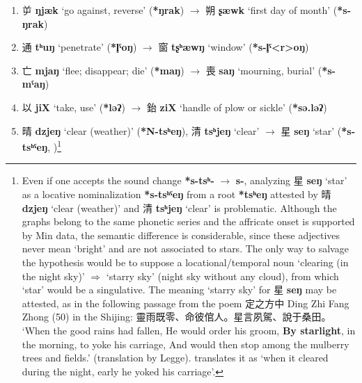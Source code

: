 \documentclass[oneside,a4paper,11pt]{article}
\newcommand{\ipa}[1]{\textbf{{\phon\mbox{#1}}}} %
\newcommand{\zh}[1]{{\cn #1}}
\newcommand{\zhc}[2]{\zh{#1} \ipa{#2}}
\begin{document}
\begin{enumerate}
\item \zhc{屰}{ŋjæk} ‘go against, reverse’ (\ipa{*ŋrak})  $\rightarrow$ \zhc{朔}{ʂæwk} ‘first day of month’  (\ipa{*s-ŋrak})
\item \zhc{通}{tʰuŋ} ‘penetrate’ (\ipa{*l̥ˤoŋ}) $\rightarrow$ \zhc{窗}{tʂʰæwŋ} ‘window’ (\ipa{*s-l̥ˤ<r>oŋ})
\item \zhc{亡}{mjaŋ} ‘flee; disappear; die’ (\ipa{*maŋ}) $\rightarrow$ \zhc{喪}{saŋ} ‘mourning, burial’ (\ipa{*s-mˤaŋ})
\item \zhc{以}{jiX} ‘take, use’ (\ipa{*ləʔ}) $\rightarrow$ \zhc{鈶}{ziX} ‘handle of plow or sickle’ (\ipa{*sə.ləʔ})
\item \zhc{晴}{dzjeŋ} ‘clear (weather)’ (\ipa{*N-tsʰeŋ}), \zhc{清}{tsʰjeŋ} ‘clear'  $\rightarrow$ \zhc{星}{seŋ} `star’ (\ipa{*s-tsʰˤeŋ},  \citealt[139]{bs14oc})\footnote{Even if one accepts the sound change \ipa{*s-tsʰ-} $\rightarrow$ \ipa{s-}, analyzing \zhc{星}{seŋ} `star’ as a locative nominalization \ipa{*s-tsʰˤeŋ} from a root \ipa{*tsʰeŋ} attested by \zhc{晴}{dzjeŋ} ‘clear (weather)’ and \zhc{清}{tsʰjeŋ} ‘clear' is problematic. Although the graphs belong to the same phonetic series and the affricate onset is supported by Min data, the semantic difference is considerable, since these adjectives never mean `bright' and are not associated to stars. The only way to salvage the hypothesis would be to suppose a locational/temporal noun `clearing (in the night sky)' $\Rightarrow$ `starry sky' (night sky without any cloud), from which `star' would be a singulative.
The meaning `starry sky' for \zhc{星}{seŋ} may be attested, as in the following passage from the poem \zh{定之方中} Ding Zhi Fang Zhong (50) in the Shijing: \zh{靈雨既零、命彼倌人。星言夙駕、說于桑田。} `When the good rains had fallen, He would order his groom, \textbf{By starlight}, in the morning, to yoke his carriage, And would then stop among the mulberry trees and fields.' (translation by Legge). \citet[33]{karlgren74odes} translates it as `when it cleared during the night, early he yoked his carriage'. 

}
\end{enumerate}
\end{document}
